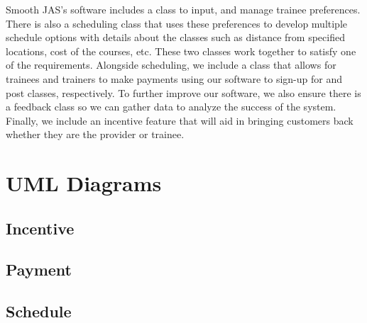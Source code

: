 \documentclass[12pt]{article}
\begin{document}
	Smooth JAS’s software includes a class to input, and manage trainee preferences. There is also a scheduling class that uses these preferences to develop multiple schedule options with details about the classes such as distance from specified locations, cost of the courses, etc. These two classes work together to satisfy one of the requirements. Alongside scheduling, we include a class that allows for trainees and trainers to make payments using our software to sign-up for and post classes, respectively. To further improve our software, we also ensure there is a feedback class so we can gather data to analyze the success of the system. Finally, we include an incentive feature that will aid in bringing customers back whether they are the provider or trainee. 

\section{UML Diagrams}
\subsection{Incentive}
\noindent%
\begin{minipage}{\linewidth}
\end{minipage}

\subsection{Payment}
\noindent%
\begin{minipage}{\linewidth}%
\end{minipage}

\subsection{Schedule}
\noindent
\begin{minipage}{\linewidth}
\end{minipage}
\end{document}
